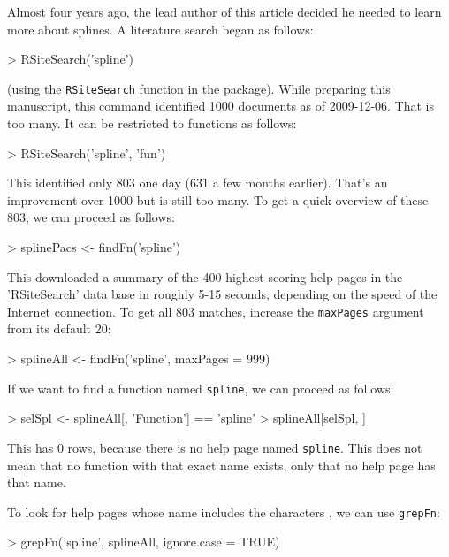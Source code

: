 \documentclass[a4paper]{report}
\begin{document}
\begin{article}
Almost four years ago, the lead author of this article decided he
needed to learn more about splines.  A literature search
began as follows:
\begin{Schunk}
\begin{Sinput}
> RSiteSearch('spline')
\end{Sinput}
\end{Schunk}
(using the {\tt RSiteSearch} function in the  package).
While preparing this manuscript, this command identified
1000 documents as of 2009-12-06.  That is too many.  It can be
restricted to functions as follows:
\begin{Schunk}
\begin{Sinput}
> RSiteSearch('spline', 'fun')
\end{Sinput}
\end{Schunk}
This identified only 803 one day (631 a few months earlier).
That's an improvement over 1000 but is still too many.
To get a quick overview of these 803, we can proceed
as follows:
\begin{Schunk}
\begin{Sinput}
> splinePacs <- findFn('spline')
\end{Sinput}
\end{Schunk}
This downloaded a summary of the 400 highest-scoring help pages
in the 'RSiteSearch' data base in roughly 5-15 seconds, depending
on the speed of the Internet connection.  To get all  803  matches,
increase the {\tt maxPages} argument from its default 20:
\begin{Schunk}
\begin{Sinput}
> splineAll <- findFn('spline', maxPages = 999)
\end{Sinput}
\end{Schunk}

If we want to find a function named {\tt spline}, we can
proceed as follows:
\begin{Schunk}
\begin{Sinput}
> selSpl <- splineAll[, 'Function'] == 'spline'
> splineAll[selSpl, ]
\end{Sinput}
\end{Schunk}

This has 0 rows, because there is no help page named
{\tt spline}.  This does not mean that no function
with that exact name exists, only that no help page
has that name.

To look for help pages whose name includes the characters
, we can use {\tt grepFn}:
\begin{Schunk}
\begin{Sinput}
> grepFn('spline', splineAll, ignore.case = TRUE)
\end{Sinput}
\end{Schunk}


\end{article}
\end{document}
